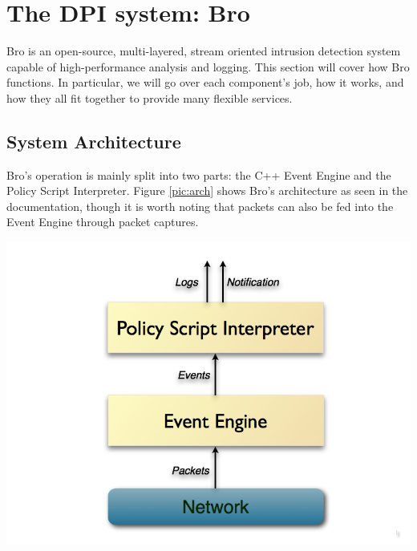 

\chapter{The DPI system: Bro} \label{chap:bro}
Bro is an open-source, multi-layered, stream oriented intrusion detection system capable of high-performance analysis and logging. This section will cover how Bro functions. In particular, we will go over each component's job, how it works, and how they all fit together to provide many flexible services.

\section{System Architecture}
Bro's operation is mainly split into two parts: the C++ Event Engine  and the Policy Script Interpreter. Figure \ref{pic:arch} shows Bro's architecture as seen in the documentation, though it is worth noting that packets can also be fed into the Event Engine through packet captures. \\


\begin{minipage}[c]{\textwidth}
\centering
\includegraphics[scale=0.3]{Figures/architecture.png}
\label{pic:arch}
\end{minipage} \\



